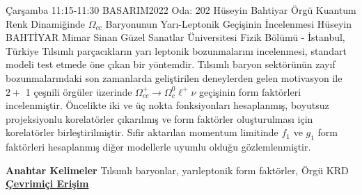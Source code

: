 
    \begin{abstract_basarim}
    {Çarşamba 11:15-11:30}
    {BASARIM2022}
    {Oda: 202}
    {Hüseyin Bahtiyar}
    {Örgü Kuantum Renk Dinamiğinde $\Omega_{c c}$ Baryonunun Yarı-Leptonik Geçişinin İncelenmesi}
    {%
    Hüseyin BAHTİYAR}
    {%
    }
    {%
    Mimar Sinan Güzel Sanatlar Üniversitesi Fizik Bölümü - İstanbul, Türkiye}
    Tılsımlı parçacıkların yarı leptonik bozunmalarını incelenmesi, standart modeli test etmede öne çıkan bir yöntemdir. Tılsımlı baryon sektörünün zayıf bozunmalarındaki son zamanlarda geliştirilen deneylerden gelen motivasyon ile $2+$ 1 çeşnili örgüler üzerinde $\Omega_{c c}^{+} \rightarrow \Omega_{c}^{0} \ell^{+} \nu$ geçişinin form faktörleri incelenmiştir. Öncelikte iki ve üç nokta fonksiyonları hesaplanmış, boyutsuz projeksiyonlu korelatörler çıkarılmış ve form faktörler oluşturulması için korelatörler birleştirilmiştir. Sıfir aktarılan momentum limitinde $f_{1}$ ve $g_{1}$ form faktörleri hesaplanmış diğer modellerle uyumlu olduğu gözlemlenmiştir. 
    
            \textbf{Anahtar Kelimeler} \newline{}Tılsımlı baryonlar, yarıleptonik form faktörler, Örgü KRD
     \newline\newline\noindent \href{https://drive.google.com/file/d/1KmMrXC9UrNVhbc6MjvkIP_cQzeTWIYNI/view?usp=drivesdk}{\bfseries Çevrimiçi Erişim}
    \end{abstract_basarim}
    